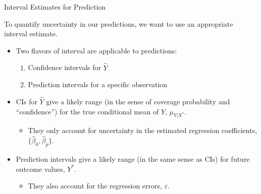 \documentclass{beamer}\usepackage[]{graphicx}\usepackage[]{color}
\begin{document}
\begin{frame}{Interval Estimates for Prediction}
  
  To quantify uncertainty in our predictions, we want to use an appropriate
  interval estimate.  
  \vb
  \begin{itemize}
  \item Two flavors of interval are applicable to predictions:
    \begin{enumerate}
    \item Confidence intervals for $\hat{Y}$
      \vc
    \item Prediction intervals for a specific observation
    \end{enumerate}
    \vb
  \item CIs for $\hat{Y}$ give a likely range (in the sense of coverage 
    probability and ``confidence'') for the true conditional mean of $Y$, 
    $\mu_{Y|X^*}$.
    \begin{itemize}
    \item They only account for uncertainty in the estimated regression 
      coefficients, $\{\hat{\beta}_0, \hat{\beta}_p\}$.
    \end{itemize}
    \vb
  \item Prediction intervals give a likely range (in the same sense as CIs) for 
    future outcome values, $Y^*$.
    \begin{itemize}
    \item They also account for the regression errors, $\varepsilon$. 
    \end{itemize}
  \end{itemize}
  
\end{frame}

\watermarkoff %
\end{document}
